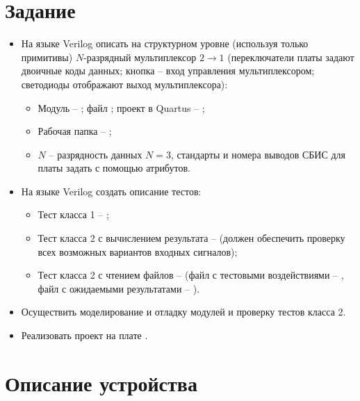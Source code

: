 





\tableofcontents
\lstlistoflistings
\listoffigures
\newpage

\section{Задание}

\begin{itemize}
	\item На языке Verilog описать на структурном уровне (используя только примитивы) $N$-разрядный мультиплексор $2 \rightarrow 1$ (переключатели платы  задают двоичные коды данных; кнопка -- вход управления мультиплексором; светодиоды отображают выход мультиплексора):
		\begin{itemize}
			\item Модуль -- ; файл ; проект в Quartus -- ;
			\item Рабочая папка -- ;
			\item $N$ -- разрядность данных $N = 3$, стандарты и номера выводов СБИС для платы  задать с помощью атрибутов.
		\end{itemize}

	\item На языке Verilog создать описание тестов:
		\begin{itemize}
			\item Тест класса 1 -- ;
			\item Тест класса 2 с вычислением результата --  (должен обеспечить проверку всех возможных вариантов входных сигналов);
			\item Тест класса 2 с чтением файлов --  (файл с тестовыми воздействиями -- , файл с ожидаемыми результатами -- ).
		\end{itemize}
	
	\item Осуществить моделирование и отладку модулей и проверку тестов класса 2.
	
	\item Реализовать проект на плате .
\end{itemize}

\section{Описание устройства}

